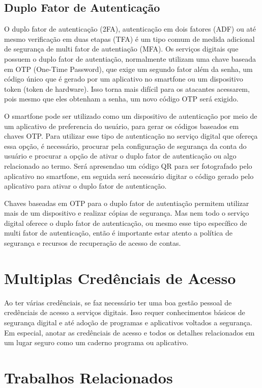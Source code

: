 \documentclass[12pt]{article}
\begin{document}
\subsection{Duplo Fator de Autenticação}

O duplo fator de autenticação (2FA), autenticação em dois fatores (ADF) ou
até mesmo verificação em duas etapas (TFA) é um tipo comum de medida adicional
de segurança de multi fator de autentiação (MFA).
Os serviços digitais que possuem o duplo fator de autentiação, normalmente
utilizam uma chave baseada em OTP (One-Time Password), que exige um segundo fator
além da senha, um código único que é gerado por um aplicativo no smartfone ou um
dispositivo token (token de hardware).
Isso torna mais difícil para os atacantes acessarem, pois mesmo que eles
obtenham a senha, um novo código OTP será exigido.

O smartfone pode ser utilizado como um dispositivo de autenticação por meio de um
aplicativo de preferencia do usuário, para gerar os códigos baseados em chaves OTP.
Para utilizar esse tipo de autenticação no serviço digital que ofereça essa opção,
é necessário, procurar pela configuração de segurança da conta do usuário e procurar
a opção de ativar o duplo fator de autenticação ou algo relacionado ao termo.
Será apresendao um código QR para ser fotografado pelo aplicativo no smartfone,
em seguida será necessário digitar o código gerado pelo aplicativo para ativar o
duplo fator de autenticação.

Chaves baseadas em OTP para o duplo fator de autentiação permitem utilizar mais
de um dispositivo e realizar cópias de segurança.
Mas nem todo o serviço digital oferece o duplo fator de autenticação, ou
mesmo esse tipo específico de multi fator de autenticação, então é importante
estar atento a política de segurança e recursos de recuperação de acesso de contas.

\section{Multiplas Credênciais de Acesso}

Ao ter várias credênciais, se faz necessário ter uma boa gestão pessoal de credênciais
de acesso a serviços digitais.
Isso requer conhecimentos básicos de segurança digital e até adoção de programas e
aplicativos voltados a segurança.
Em especial, anotar as credênciais de acesso e todos os detalhes relacionados em um
lugar seguro como um caderno programa ou aplicativo.

\section{Trabalhos Relacionados}
\end{document}
